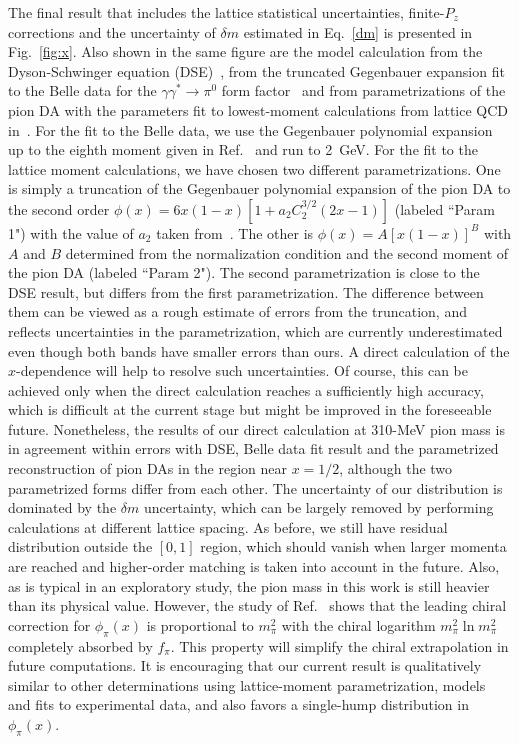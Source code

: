 The final result that includes the lattice statistical uncertainties, finite-$P_z$ corrections and the uncertainty of $\delta m$ estimated in Eq.~\ref{dm} is presented in Fig.~\ref{fig:x}. 
Also shown in the same figure are the model calculation from the Dyson-Schwinger equation (DSE)~\cite{Chang:2013pq}, from the truncated Gegenbauer expansion fit to the Belle data for the $\gamma\gamma^*\to\pi^0$ form factor~\cite{Agaev:2012tm} and from parametrizations of the pion DA with the parameters fit to lowest-moment calculations from lattice QCD in~\cite{Braun:2015axa}. For the fit to the Belle data, we use the Gegenbauer polynomial expansion up to the eighth moment given in Ref.~\cite{Agaev:2012tm} and run to 2~GeV. For the fit to the lattice moment calculations, we have chosen two different parametrizations. One is simply a truncation of the Gegenbauer polynomial expansion of the pion DA to the second order $\phi(x)=6x(1-x)[1+a_2 C_2^{3/2}(2x-1)]$ (labeled ``Param 1") with the value of $a_2$ taken from~\cite{Braun:2015axa}. The other is $\phi(x)=A[x(1-x)]^B$ with $A$ and $B$ determined from the normalization condition and the second moment of the pion DA (labeled ``Param 2"). The second parametrization is close to the DSE result, but differs from the first parametrization. The difference between them can be viewed as a rough estimate of errors from the truncation, and reflects uncertainties in the parametrization, which are currently underestimated even though both bands have smaller errors than ours. A direct calculation of the $x$-dependence will help to resolve such uncertainties. Of course, this can be achieved only when the direct calculation reaches a sufficiently high accuracy, which is difficult at the current stage but might be improved in the foreseeable future. Nonetheless,
the results of our direct calculation at 310-MeV pion mass is in agreement within errors with DSE, Belle data fit result and the parametrized reconstruction of pion DAs in the region near $x=1/2$, although the two parametrized forms differ from each other.
The uncertainty of our distribution is dominated by the $\delta m$ uncertainty, which can be largely removed by performing calculations at different lattice spacing. 
As before, we still have residual distribution outside the $[0,1]$ region, which should vanish when larger momenta are reached and higher-order matching is taken into account in the future. 
Also, as is typical in an exploratory study, the pion mass in this work is still heavier than its physical value. However, the study of Ref.~\cite{Chen:2003fp} shows that the leading chiral correction for $\phi_{\pi}(x)$ is proportional to $m_{\pi}^2$ with the chiral logarithm $m_{\pi}^2 \ln m_{\pi}^2$ completely absorbed by $f_{\pi}$. This property will simplify the chiral extrapolation in future computations.
It is encouraging that our current result is qualitatively similar to other determinations using lattice-moment parametrization, models and fits to experimental data, and also favors a single-hump distribution in $\phi_{\pi}(x)$. 

